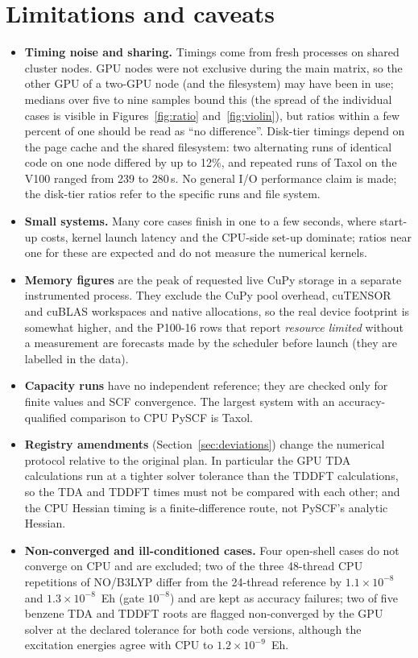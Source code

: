\section{Limitations and caveats}
\label{sec:limits}

\begin{itemize}[leftmargin=*,itemsep=2pt]
\item \textbf{Timing noise and sharing.} Timings come from fresh processes on shared cluster nodes. GPU nodes were not exclusive during the main matrix, so the other GPU of a two-GPU node (and the filesystem) may have been in use; medians over five to nine samples bound this (the spread of the individual cases is visible in Figures~\ref{fig:ratio} and~\ref{fig:violin}), but ratios within a few percent of one should be read as ``no difference''. Disk-tier timings depend on the page cache and the shared filesystem: two alternating runs of identical code on one node differed by up to 12\%, and repeated runs of Taxol on the V100 ranged from 239 to 280\,s. No general I/O performance claim is made; the disk-tier ratios refer to the specific runs and file system.
\item \textbf{Small systems.} Many core cases finish in one to a few seconds, where start-up costs, kernel launch latency and the CPU-side set-up dominate; ratios near one for these are expected and do not measure the numerical kernels.
\item \textbf{Memory figures} are the peak of requested live CuPy storage in a separate instrumented process. They exclude the CuPy pool overhead, cuTENSOR and cuBLAS workspaces and native allocations, so the real device footprint is somewhat higher, and the P100-16 rows that report \emph{resource limited} without a measurement are forecasts made by the scheduler before launch (they are labelled in the data).
\item \textbf{Capacity runs} have no independent reference; they are checked only for finite values and SCF convergence. The largest system with an accuracy-qualified comparison to CPU PySCF is Taxol.
\item \textbf{Registry amendments} (Section~\ref{sec:deviations}) change the numerical protocol relative to the original plan. In particular the GPU TDA calculations run at a tighter solver tolerance than the TDDFT calculations, so the TDA and TDDFT times must not be compared with each other; and the CPU Hessian timing is a finite-difference route, not PySCF's analytic Hessian.
\item \textbf{Non-converged and ill-conditioned cases.} Four open-shell cases do not converge on CPU and are excluded; two of the three 48-thread CPU repetitions of NO/B3LYP differ from the 24-thread reference by $1.1\times10^{-8}$ and $1.3\times10^{-8}$~Eh (gate $10^{-8}$) and are kept as accuracy failures; two of five benzene TDA and TDDFT roots are flagged non-converged by the GPU solver at the declared tolerance for both code versions, although the excitation energies agree with CPU to $1.2\times10^{-9}$~Eh.

\end{itemize}
